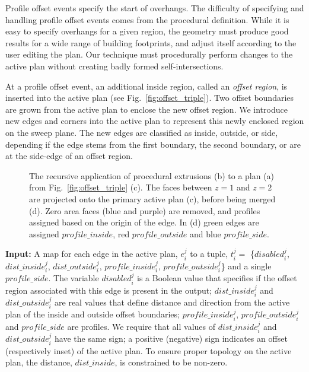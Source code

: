 Profile offset events specify the start of overhangs. The difficulty of specifying and handling profile offset events comes from the procedural definition. While it is easy to specify overhangs for a given region, the geometry must produce good results for a wide range of building footprints, and adjust itself according to the user editing the plan. Our technique must procedurally perform changes to the active plan without creating badly formed self-intersections.

At a profile offset event, an additional inside region, called an \emph{offset region}, is inserted into the active plan (see Fig.~\ref{fig:offset_triple}). Two offset boundaries are grown from the active plan to enclose the new offset region. We introduce new edges and corners into the active plan to represent this newly enclosed region on the sweep plane. The new edges are classified as inside, outside, or side, depending if the edge stems from the first boundary, the second boundary, or are at the side-edge of an offset region.

\begin{figure}
  \centering
  \def\svgwidth{0.7\columnwidth}
  
  \caption[Calculating offset events]{\label{fig:offset_recursive}The recursive application of procedural extrusions (b) to a plan (a) from Fig.~\ref{fig:offset_triple} (c). The faces between $z=1$ and $z=2$ are projected onto the primary active plan (c), before being merged (d). Zero area faces (blue and purple) are removed, and profiles assigned based on the origin of the edge. In (d) green edges are assigned $profile\_inside$, red $profile\_outside$ and blue $profile\_side$.
}
\end{figure}

{\bf Input:} A map for each edge in the active plan, $e^j_i$ to a tuple, $t^j_i = $ \{$disabled^j_i$, $dist\_inside^j_i$, $dist\_outside^j_i$, $profile\_inside^j_i$, $profile\_outside^j_i$\} and a single \newline $profile\_side$. The variable $disabled^j_i$ is a Boolean value that specifies if the offset region associated with this edge is present in the output; $dist\_inside^j_i$ and $dist\_outside^j_i$ are real values that define distance and direction from the active plan of the inside and outside offset boundaries;  $profile\_inside^j_i$, $profile\_outside^j_i$ and $profile\_side$ are profiles. We require that all values of $dist\_inside^j_i$ and $dist\_outside^j_i$ have the same sign; a positive (negative) sign indicates an offset (respectively inset) of the active plan. To ensure proper topology on the active plan, the distance, $dist\_inside$, is constrained to be non-zero. 

